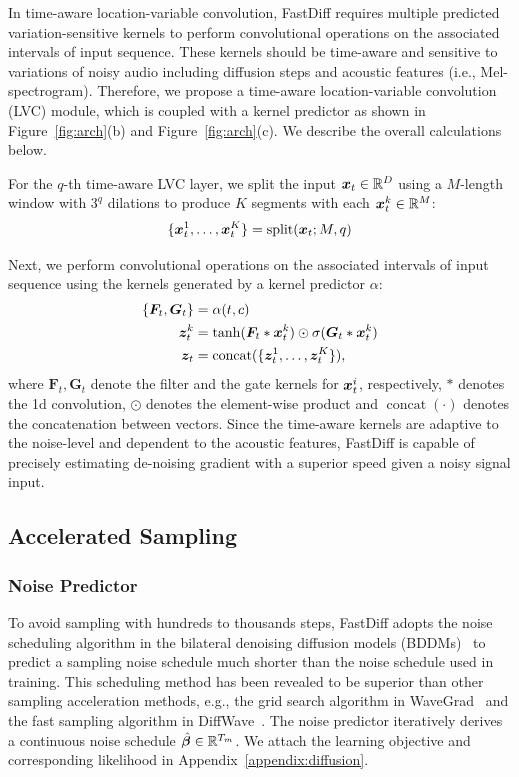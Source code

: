 In time-aware location-variable convolution, FastDiff requires multiple predicted variation-sensitive kernels to perform convolutional operations on the associated intervals of input sequence. These kernels should be time-aware and sensitive to variations of noisy audio including diffusion steps and acoustic features (i.e., Mel-spectrogram). Therefore, we propose a time-aware location-variable convolution (LVC) module, which is coupled with a kernel predictor as shown in Figure~\ref{fig:arch}(b) and Figure~\ref{fig:arch}(c). We describe the overall calculations below.

For the $q$-th time-aware LVC layer, we split the input ${\bm{x}}_t\in{\mathbb{R}}^{D}$ using a $M$-length window with $3^q$ dilations to produce $K$ segments with each ${\bm{x}}_{t}^{k}\in{\mathbb{R}}^M$:
  \begin{equation}
    \{{\bm{x}}_{t}^{1}, \ldots, {\bm{x}}_{t}^{K}\}=\operatorname{split}({\bm{x}}_t;M, q)
\end{equation}

Next, we perform convolutional operations on the associated intervals of input sequence using the kernels generated by a kernel predictor $\alpha$:
\begin{align}
    \{ {\bm{F}}_{t}, {\bm{G}}_{t}\} &= \alpha (t, c) \\ 
    \boldsymbol{z}_{t}^{k} &=\tanh (\boldsymbol{F}_{t} *  \boldsymbol{x}_{t}^{k}) \odot \sigma(\boldsymbol{G}_{t} *  \boldsymbol{x}_{t}^{k})\\
    \boldsymbol{z}_{t}&=\operatorname{concat}(\{\boldsymbol{z}_{t}^{1}, \ldots, \boldsymbol{z}_{t}^{K}\}),
\end{align}
where $\boldsymbol{F}_{t}, \boldsymbol{G}_{t}$ denote the filter and the gate kernels for ${\bm{x}}_t^i$, respectively, $*$ denotes the 1d convolution, $\odot$ denotes the element-wise product and $\operatorname{concat}(\cdot)$ denotes the concatenation between vectors. Since the time-aware kernels are adaptive to the noise-level and dependent to the acoustic features, FastDiff is capable of precisely estimating de-noising gradient with a superior speed given a noisy signal input.

\subsection{Accelerated Sampling}

\subsubsection{Noise Predictor}
To avoid sampling with hundreds to thousands steps, FastDiff adopts the noise scheduling algorithm in the bilateral denoising diffusion models (BDDMs)~\cite{lam2022bddm} to predict a sampling noise schedule much shorter than the noise schedule used in training. This scheduling method has been revealed to be superior than other sampling acceleration methods, e.g.,  the grid search algorithm in WaveGrad~\cite{chen2020wavegrad} and the fast sampling algorithm in DiffWave~\cite{kong2020diffwave}. The noise predictor iteratively derives a continuous noise schedule $\hat{{\bm{\beta}}}\in{\mathbb{R}}^{T_m}$. We attach the learning objective and corresponding likelihood in Appendix~\ref{appendix:diffusion}. 

